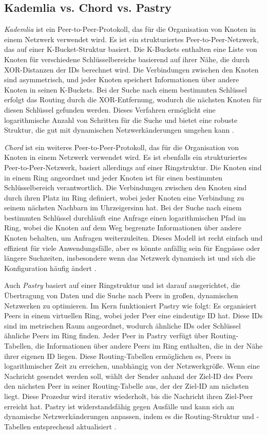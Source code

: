 \subsection{Kademlia vs. Chord vs. Pastry}

\textit{Kademlia} ist ein Peer-to-Peer-Protokoll, das für die Organisation von Knoten in einem Netzwerk verwendet wird. Es ist ein strukturiertes Peer-to-Peer-Netzwerk, das auf einer K-Bucket-Struktur basiert. Die K-Buckets enthalten eine Liste von Knoten für verschiedene Schlüsselbereiche basierend auf ihrer Nähe, die durch XOR-Distanzen der IDs berechnet wird. Die Verbindungen zwischen den Knoten sind asymmetrisch, und jeder Knoten speichert Informationen über andere Knoten in seinen K-Buckets. Bei der Suche nach einem bestimmten Schlüssel erfolgt das Routing durch die XOR-Entfernung, wodurch die nächsten Knoten für diesen Schlüssel gefunden werden. Dieses Verfahren ermöglicht eine logarithmische Anzahl von Schritten für die Suche und bietet eine robuste Struktur, die gut mit dynamischen Netzwerkänderungen umgehen kann \parencite[S. 1-2]{Maymounkov_Kademlia}.

\textit{Chord} ist ein weiteres Peer-to-Peer-Protokoll, das für die Organisation von Knoten in einem Netzwerk verwendet wird. Es ist ebenfalls ein strukturiertes Peer-to-Peer-Netzwerk, basiert allerdings auf einer Ringstruktur. Die Knoten sind in einem Ring angeordnet und jeder Knoten ist für einen bestimmten Schlüsselbereich verantwortlich. Die Verbindungen zwischen den Knoten sind durch ihren Platz im Ring definiert, wobei jeder Knoten eine Verbindung zu seinem nächsten Nachbarn im Uhrzeigersinn hat. Bei der Suche nach einem bestimmten Schlüssel durchläuft eine Anfrage einen logarithmischen Pfad im Ring, wobei die Knoten auf dem Weg begrenzte Informationen über andere Knoten behalten, um Anfragen weiterzuleiten. Dieses Modell ist recht einfach und effizient für viele Anwendungsfälle, aber es könnte anfällig sein für Engpässe oder längere Suchzeiten, insbesondere wenn das Netzwerk dynamisch ist und sich die Konfiguration häufig ändert \parencite[S. 1-2]{Stoica_Chord}.

Auch \textit{Pastry} basiert auf einer Ringstruktur und ist darauf ausgerichtet, die Übertragung von Daten und die Suche nach Peers in großen, dynamischen Netzwerken zu optimieren. Im Kern funktioniert Pastry wie folgt: Es organisiert Peers in einem virtuellen Ring, wobei jeder Peer eine eindeutige ID hat. Diese IDs sind im metrischen Raum angeordnet, wodurch ähnliche IDs oder Schlüssel ähnliche Peers im Ring finden. Jeder Peer in Pastry verfügt über Routing-Tabellen, die Informationen über andere Peers im Ring enthalten, die in der Nähe ihrer eigenen ID liegen. Diese Routing-Tabellen ermöglichen es, Peers in logarithmischer Zeit zu erreichen, unabhängig von der Netzwerkgröße. Wenn eine Nachricht gesendet werden soll, wählt der Sender anhand der Ziel-ID des Peers den nächsten Peer in seiner Routing-Tabelle aus, der der Ziel-ID am nächsten liegt. Diese Prozedur wird iterativ wiederholt, bis die Nachricht ihren Ziel-Peer erreicht hat. Pastry ist widerstandsfähig gegen Ausfälle und kann sich an dynamische Netzwerkänderungen anpassen, indem es die Routing-Struktur und -Tabellen entsprechend aktualisiert \parencite[S. 331-339]{Rowstron_Pastry}.


